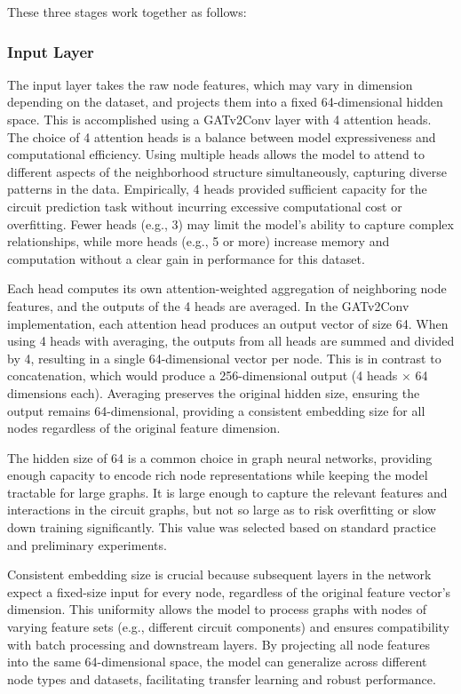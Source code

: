 \documentclass[10pt,twocolumn,letterpaper]{article}
\begin{document}
These three stages work together as follows:

\subsubsection{Input Layer}
\label{subsubsec:input_layer}

The input layer takes the raw node features, which may vary in dimension depending on the dataset, and projects them into a fixed 64-dimensional hidden space. This is accomplished using a GATv2Conv layer with 4 attention heads. The choice of 4 attention heads is a balance between model expressiveness and computational efficiency. Using multiple heads allows the model to attend to different aspects of the neighborhood structure simultaneously, capturing diverse patterns in the data. Empirically, 4 heads provided sufficient capacity for the circuit prediction task without incurring excessive computational cost or overfitting. Fewer heads (e.g., 3) may limit the model's ability to capture complex relationships, while more heads (e.g., 5 or more) increase memory and computation without a clear gain in performance for this dataset.

Each head computes its own attention-weighted aggregation of neighboring node features, and the outputs of the 4 heads are averaged. In the GATv2Conv implementation, each attention head produces an output vector of size 64. When using 4 heads with averaging, the outputs from all heads are summed and divided by 4, resulting in a single 64-dimensional vector per node. This is in contrast to concatenation, which would produce a 256-dimensional output (4 heads $\times$ 64 dimensions each). Averaging preserves the original hidden size, ensuring the output remains 64-dimensional, providing a consistent embedding size for all nodes regardless of the original feature dimension.

The hidden size of 64 is a common choice in graph neural networks, providing enough capacity to encode rich node representations while keeping the model tractable for large graphs. It is large enough to capture the relevant features and interactions in the circuit graphs, but not so large as to risk overfitting or slow down training significantly. This value was selected based on standard practice and preliminary experiments.

Consistent embedding size is crucial because subsequent layers in the network expect a fixed-size input for every node, regardless of the original feature vector's dimension. This uniformity allows the model to process graphs with nodes of varying feature sets (e.g., different circuit components) and ensures compatibility with batch processing and downstream layers. By projecting all node features into the same 64-dimensional space, the model can generalize across different node types and datasets, facilitating transfer learning and robust performance.
\end{document}
